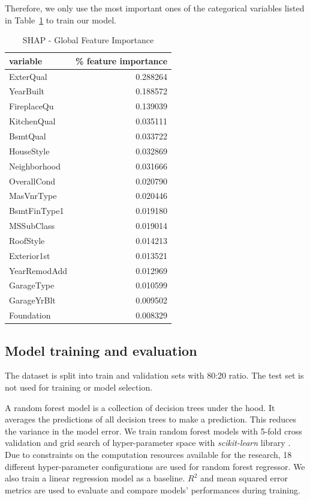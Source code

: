 \documentclass[conference]{IEEEtran}
\begin{document}
Therefore, we only use the most important ones of the categorical variables 
listed in Table~\ref{table:shap-global-feature-importance} to train our model. 
\begin{table}[htbp]
    \caption{SHAP - Global Feature Importance}
\begin{center}
\begin{tabular}{lr}
    \hline
        variable &  \% feature importance \\
    \hline
       ExterQual &    0.288264 \\
       YearBuilt &    0.188572 \\
     FireplaceQu &    0.139039 \\
     KitchenQual &    0.035111 \\
        BsmtQual &    0.033722 \\
      HouseStyle &    0.032869 \\
    Neighborhood &    0.031666 \\
     OverallCond &    0.020790 \\
      MasVnrType &    0.020446 \\
    BsmtFinType1 &    0.019180 \\
      MSSubClass &    0.019014 \\
       RoofStyle &    0.014213 \\
     Exterior1st &    0.013521 \\
    YearRemodAdd &    0.012969 \\
      GarageType &    0.010599 \\
     GarageYrBlt &    0.009502 \\
      Foundation &    0.008329 \\
    \hline
\end{tabular}
\label{table:shap-global-feature-importance}
\end{center}
\end{table}

\subsection{Model training and evaluation}

The dataset is split into train and validation sets with 80:20 ratio. 
The test set is not used for training or model selection. 

A random forest model is a collection of decision trees under the hood. 
It averages the predictions of all decision trees to make a prediction. 
This reduces the variance in the model error. 
We train random forest models with 5-fold cross validation and grid search of 
hyper-parameter space with \textit{scikit-learn} library \cite{scikit-learn}. 
Due to constraints on the computation resources available for the research, 
18 different hyper-parameter configurations are used for random forest regressor. 
We also train a linear regression model as a baseline. 
$R^2$ and mean squared error metrics are used to evaluate and compare models' performances during training. 
\end{document}
